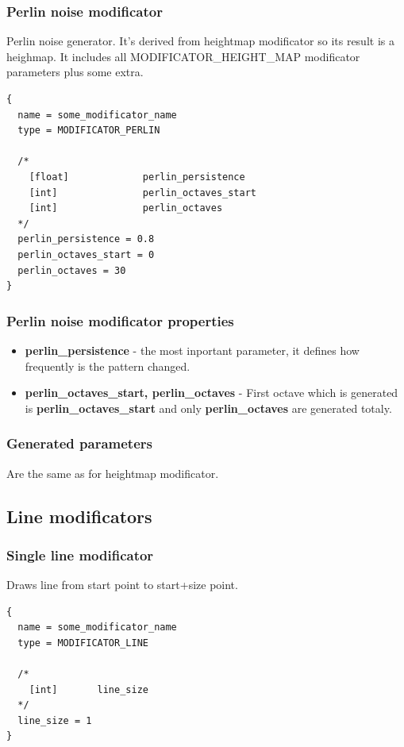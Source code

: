 \documentclass[9pt]{article}
\begin{document}
\subsubsection{Perlin noise modificator}

Perlin noise generator. It's derived from heightmap modificator
so its result is a heighmap. It includes all MODIFICATOR\_HEIGHT\_MAP modificator 
parameters plus some extra.

\begin{verbatim}
{
  name = some_modificator_name
  type = MODIFICATOR_PERLIN

  /*
    [float]             perlin_persistence
    [int]               perlin_octaves_start
    [int]               perlin_octaves
  */
  perlin_persistence = 0.8
  perlin_octaves_start = 0
  perlin_octaves = 30
}
\end{verbatim}
\subsubsection*{Perlin noise modificator properties}
\begin{itemize}
\item{\bf perlin\_persistence} - the most inportant parameter, it defines how frequently
is the pattern changed.
\item{\bf perlin\_octaves\_start, perlin\_octaves} - First octave which is generated 
is {\bf perlin\_octaves\_start} and only {\bf perlin\_octaves} are generated totaly.
\end{itemize}

\subsubsection*{Generated parameters}
Are the same as for heightmap modificator.

\subsection{Line modificators}
\subsubsection{Single line modificator}

Draws line from start point to start+size point.

\begin{verbatim}
{
  name = some_modificator_name
  type = MODIFICATOR_LINE

  /*
    [int]       line_size    
  */
  line_size = 1
}
\end{verbatim}
\end{document}
